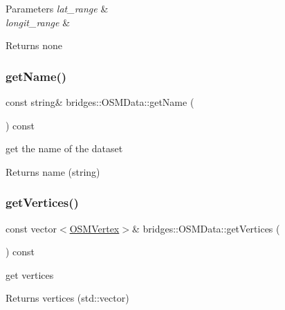 \begin{DoxyParams}{Parameters}
{\em lat\+\_\+range} & \\
\hline
{\em longit\+\_\+range} & \\
\hline
\end{DoxyParams}
\begin{DoxyReturn}{Returns}
none 
\end{DoxyReturn}
\mbox{\label{classbridges_1_1_o_s_m_data_a420a29bced0d8c04bc5afcb9adf0621a}} 
\subsubsection{\texorpdfstring{getName()}{getName()}}
{\footnotesize\ttfamily const string\& bridges\+::\+O\+S\+M\+Data\+::get\+Name (\begin{DoxyParamCaption}{ }\end{DoxyParamCaption}) const\hspace{0.3cm}{\ttfamily [inline]}}

get the name of the dataset

\begin{DoxyReturn}{Returns}
name (string) 
\end{DoxyReturn}
\mbox{\label{classbridges_1_1_o_s_m_data_a2f8fd5e4d3d0252ae7afae32f9ccc4fa}} 
\subsubsection{\texorpdfstring{getVertices()}{getVertices()}}
{\footnotesize\ttfamily const vector$<$\mbox{\hyperlink{classbridges_1_1_o_s_m_vertex}{O\+S\+M\+Vertex}}$>$\& bridges\+::\+O\+S\+M\+Data\+::get\+Vertices (\begin{DoxyParamCaption}{ }\end{DoxyParamCaption}) const\hspace{0.3cm}{\ttfamily [inline]}}

get vertices

\begin{DoxyReturn}{Returns}
vertices (std\+::vector) 
\end{DoxyReturn}
\mbox{\label{classbridges_1_1_o_s_m_data_ab61b84e459e01baa7f2c00da47ff4ccf}} 
